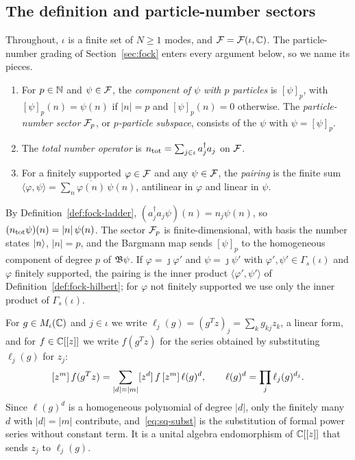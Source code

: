 \begin{vetdenv}
\subsection{The definition and particle-number sectors}\label{sec:sq-def}

Throughout, $\iota$ is a finite set of $N\ge1$ modes, and $\mathcal F=\mathcal F(\iota,\mathbb C)$. The particle-number
grading of Section~\ref{sec:fock} enters every argument below, so we name its pieces.

\begin{definition}\label{def:sq-sector}
\begin{enumerate}
\item[(a)] For $p\in\mathbb N$ and $\psi\in\mathcal F$, the \emph{component of $\psi$ with $p$ particles} is $[\psi]_p$, with
$[\psi]_p(n)=\psi(n)$ if $\lvert n\rvert=p$ and $[\psi]_p(n)=0$ otherwise. The \emph{particle-number sector}
$\mathcal F_p$, or \emph{$p$-particle subspace}, consists of the $\psi$ with $\psi=[\psi]_p$.
\item[(b)] The \emph{total number operator} is $n_{\mathrm{tot}}=\sum_{j\in\iota}a_j^\dagger a_j$ on $\mathcal F$.
\item[(c)] For a finitely supported $\varphi\in\mathcal F$ and any $\psi\in\mathcal F$, the \emph{pairing} is the finite sum
$\langle\varphi,\psi\rangle=\sum_n\overline{\varphi(n)}\,\psi(n)$, antilinear in $\varphi$ and linear in $\psi$.
\end{enumerate}
\end{definition}

By Definition~\ref{def:fock-ladder}, $(a_j^\dagger a_j\psi)(n)=n_j\psi(n)$, so $(n_{\mathrm{tot}}\psi)(n)=\lvert
n\rvert\,\psi(n)$. The sector $\mathcal F_p$ is finite-dimensional, with basis the number states $\lvert n\rangle$, $\lvert
n\rvert=p$, and the Bargmann map sends $[\psi]_p$ to the homogeneous component of degree $p$ of $\mathfrak B\psi$.
If $\varphi=\jmath\varphi'$ and $\psi=\jmath\psi'$ with $\varphi',\psi'\in\Gamma_s(\iota)$ and $\varphi$ finitely
supported, the pairing is the inner product $\langle\varphi',\psi'\rangle$ of Definition~\ref{def:fock-hilbert};
for $\varphi$ not finitely supported we use only the inner product of $\Gamma_s(\iota)$.

For $g\in M_\iota(\mathbb C)$ and $j\in\iota$ we write $\ell_j(g)=(g^Tz)_j=\sum_kg_{kj}z_k$, a linear form, and for
$f\in\mathbb C[[z]]$ we write $f(g^Tz)$ for the series obtained by substituting $\ell_j(g)$ for $z_j$:
\begin{equation}\label{eq:sq-subst}
 [z^{m}]\,f(g^Tz)=\sum_{\lvert d\rvert=\lvert m\rvert}[z^{d}]\,f\,[z^{m}]\,\ell(g)^d,\qquad
 \ell(g)^d=\prod_{j}\ell_j(g)^{d_j}.
\end{equation}
Since $\ell(g)^d$ is a homogeneous polynomial of degree $\lvert d\rvert$, only the finitely many $d$ with
$\lvert d\rvert=\lvert m\rvert$ contribute, and~\eqref{eq:sq-subst} is the substitution of formal power series
without constant term. It is a unital algebra endomorphism of $\mathbb C[[z]]$ that sends $z_j$ to $\ell_j(g)$.


\end{vetdenv}

